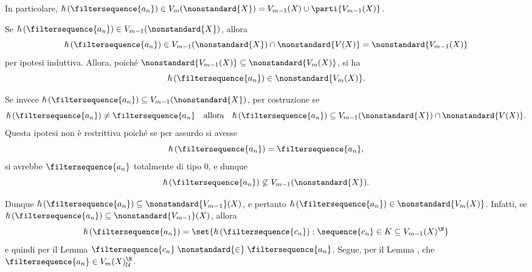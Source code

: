 {\begin{enumerate}
\begin{itemize}
\begin{itemize}
                In particolare, $ \hslash\left(\filtersequence{a_{n}}\right) \in V_{m}(\nonstandard{X}) = V_{m-1}(X)\cup \parti{V_{m-1}(X) } $. 

                Se $ \hslash\left(\filtersequence{a_{n}}\right) \in V_{m-1}(\nonstandard{X}) $, allora \begin{equation*}
                    \hslash\left(\filtersequence{a_{n}}\right) \in V_{m-1}(\nonstandard{X})\cap \nonstandard{V(X)} = \nonstandard{V_{m-1}(X) }
                \end{equation*}per ipotesi induttiva. Allora, poiché $ \nonstandard{V_{m-1}(X) } \subseteq \nonstandard{V_{m}(X) } $, si ha \begin{equation*}
                    \hslash\left(\filtersequence{a_{n}}\right) \in \nonstandard{V_{m}(X) }.
                \end{equation*}

                Se invece $ \hslash\left(\filtersequence{a_{n}}\right) \subseteq V_{m-1}(\nonstandard{X}) $, per costruzione se\begin{equation*}
                    \hslash\left(\filtersequence{a_{n}}\right) \neq \filtersequence{a_{n}}\quad\text{allora}\quad\hslash\left(\filtersequence{a_{n}}\right) \subseteq V_{m-1}(\nonstandard{X}) \cap \nonstandard{V(X)}.
                \end{equation*}Questa ipotesi non è restrittiva poiché se per assurdo si avesse\[\hslash\left(\filtersequence{a_{n}}\right) = \filtersequence{a_{n}},\] si avrebbe $ \filtersequence{a_{n}} $ totalmente di tipo $ 0 $, e dunque \[\hslash\left(\filtersequence{a_{n}}\right) \not\subseteq V_{m-1}(\nonstandard{X}).\]
                
                Dunque $ \hslash\left(\filtersequence{a_{n}}\right) \subseteq \nonstandard{V_{m-1}}(X) $, e pertanto $ \hslash\left(\filtersequence{a_{n}}\right) \in \nonstandard{V_{m}(X) } $. Infatti, se $ \hslash\left(\filtersequence{a_{n}}\right) \subseteq \nonstandard{V_{m-1}}(X) $, allora \begin{equation*}
                    \hslash\left(\filtersequence{a_{n}}\right) = \set{\hslash\left(\filtersequence{c_{n}}\right): \sequence{c_{n}} \in K \subseteq V_{m-1}(X)^{\N} }
                \end{equation*}e quindi per il Lemma  $ \filtersequence{c_{n}} \mathrel{\nonstandard{\in}} \filtersequence{a_{n}} $. Segue, per il Lemma , che $ \filtersequence{a_{n}} \in V_{m}(X)^{\N}_{\mathcal{U}}  $.
            \end{itemize}
        \end{itemize} 


\end{enumerate}}

